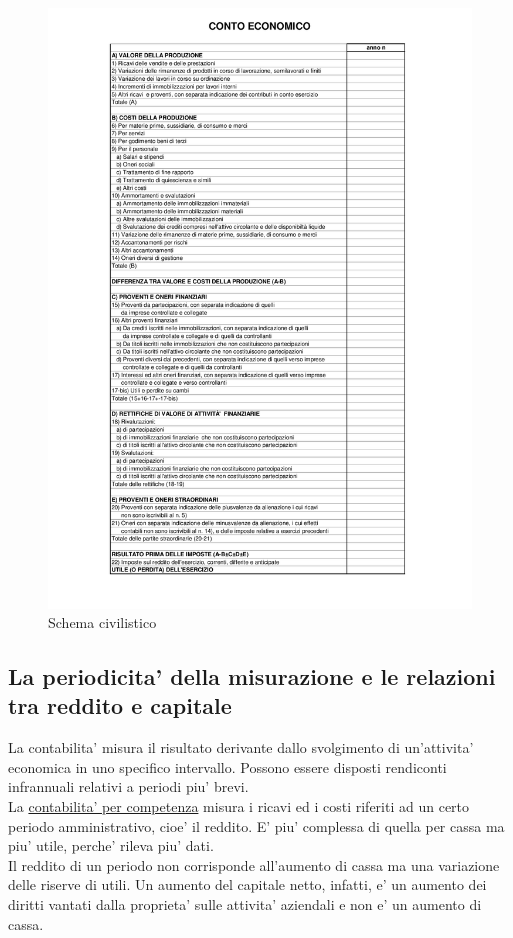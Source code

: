 \documentclass{report}
\begin{document}
	\begin{figure}[H]
		\centering
		\caption{Schema civilistico}
		\label{fig:conto-economico}
		\includegraphics[width=1\linewidth]{conto-economico}
	\end{figure}
	\newpage
	\subsection{La periodicita' della misurazione e le relazioni tra reddito e capitale}
	La contabilita' misura il risultato derivante dallo svolgimento di un'attivita' economica in uno specifico intervallo. Possono essere disposti rendiconti infrannuali relativi a periodi piu' brevi.
	\medskip \\
	La \underline{contabilita' per competenza} misura i ricavi ed i costi riferiti ad un certo periodo amministrativo, cioe' il reddito. E' piu' complessa di quella per cassa ma piu' utile, perche' rileva piu' dati.
	\medskip \\
	Il reddito di un periodo non corrisponde all'aumento di cassa ma una variazione delle riserve di utili. Un aumento del capitale netto, infatti, e' un aumento dei diritti vantati dalla proprieta' sulle attivita' aziendali e non e' un aumento di cassa.
\end{document}
